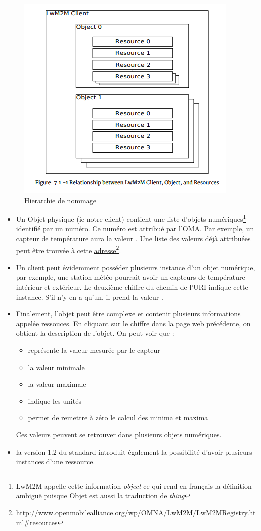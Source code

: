 \begin{figure}[tbp]
\centerline{\includegraphics[width=.6\columnwidth]{Pictures/lwm2m-objects.png}}
\caption{Hierarchie de nommage}
\label{fig-lwm2m-objects}
\end{figure}

\begin{itemize}
\item Un Objet physique (ie notre client) contient une liste d'objets numériques\footnote{LwM2M appelle cette information \textit{object} ce qui rend en français la définition ambiguë puisque Objet est aussi la traduction de \textit{thing}} identifié par un numéro. Ce numéro est attribué par l'OMA. Par exemple, un capteur de température aura la valeur \textit{}. Une liste des valeurs déjà attribuées peut être trouvée à cette \href{http://www.openmobilealliance.org/wp/OMNA/LwM2M/LwM2MRegistry.html#resources}{adresse}\footnote{\url{http://www.openmobilealliance.org/wp/OMNA/LwM2M/LwM2MRegistry.html#resources}}. 
\item Un client peut évidemment posséder plusieurs instance d'un objet numérique, par exemple, une station météo pourrait avoir un capteurs de température intérieur et extérieur. Le deuxième chiffre du chemin de l'URI indique cette instance. S'il n'y en a qu'un, il prend la valeur \textit{}.
\item Finalement, l'objet peut être complexe et contenir plusieurs informations appelée ressouces. En cliquant sur le chiffre \textit{} dans la page web précédente, on obtient la description de l'objet. On peut voir que :
\begin{itemize}
\item \textit{} représente la valeur mesurée par le capteur
\item \textit{} la valeur minimale
\item \textit{} la valeur maximale
\item \textit{} indique les unités 
\item \textit{} permet de remettre à zéro le calcul des minima et maxima
\end{itemize}
Ces valeurs peuvent se retrouver dans plusieurs objets numériques.
\item la version 1.2 du standard introduit également la possibilité d'avoir plusieurs instances d'une ressource.
\end{itemize}

